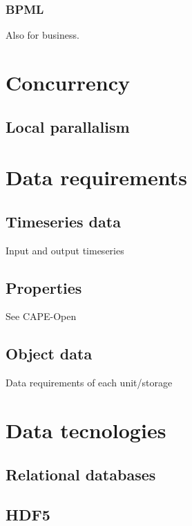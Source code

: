 \subsubsection{BPML}
Also for business.

\section{Concurrency}
\subsection{Local parallalism}

\section{Data requirements}
\subsection{Timeseries data}
Input and output timeseries

\subsection{Properties}
See CAPE-Open

\subsection{Object data}
Data requirements of each unit/storage

\section{Data tecnologies}
\subsection{Relational databases}
\subsection{HDF5}



